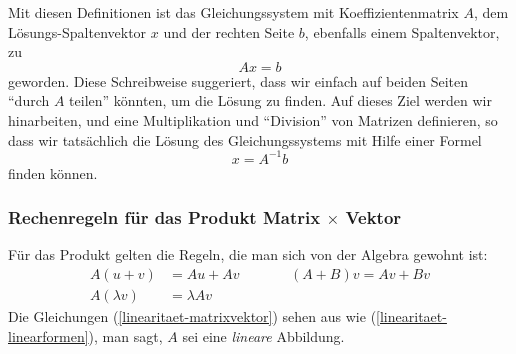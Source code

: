 Mit diesen Definitionen ist das Gleichungssystem mit Koeffizientenmatrix $A$,
dem Lösungs-Spaltenvektor $x$ und der rechten Seite $b$, ebenfalls einem
Spaltenvektor, zu
\[
Ax=b
\]
geworden.
Diese Schreibweise suggeriert, dass wir einfach auf beiden
Seiten ``durch $A$ teilen'' könnten, um die Lösung zu finden.
Auf dieses
Ziel werden wir hinarbeiten, und eine Multiplikation und ``Division''
von Matrizen definieren, so dass wir tatsächlich die Lösung des Gleichungssystems
mit Hilfe einer Formel
\[
x=A^{-1}b
\]
finden können.

\subsubsection{Rechenregeln für das Produkt Matrix $\times$ Vektor}
Für das Produkt gelten die Regeln, die man sich von der Algebra 
gewohnt ist:
\begin{equation}
\begin{aligned}
A(u+v)&=Au+Av&\qquad&(A+B)v=Av+Bv\\
A(\lambda v)&=\lambda Av
\end{aligned}
\label{linearitaet-matrixvektor}
\end{equation}
Die Gleichungen (\ref{linearitaet-matrixvektor}) sehen aus wie
(\ref{linearitaet-linearformen}),
man sagt, $A$ sei eine {\em lineare} Abbildung.

